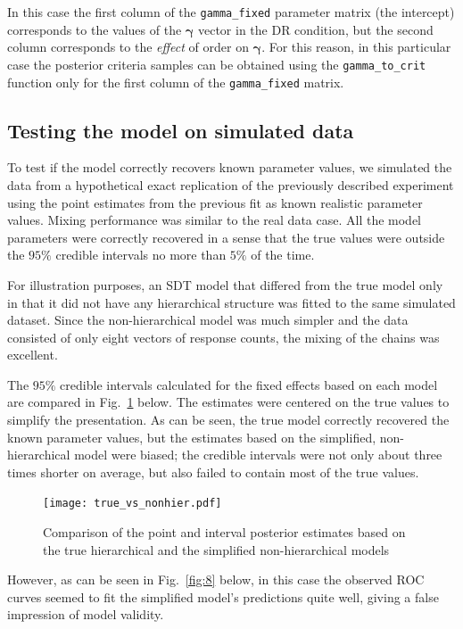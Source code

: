 \documentclass[a4paper,man,apacite,floatsintext]{apa6}
\newcommand{\code}[1]{\texttt{#1}}
\begin{document}
In this case the first column of the \code{gamma\_fixed} parameter
matrix (the intercept) corresponds to the values of the $\bm{\gamma}$
vector in the DR condition, but the second column corresponds to the
\emph{effect} of order on $\bm{\gamma}$. For this reason, in this
particular case the posterior criteria samples can be obtained using
the \code{gamma\_to\_crit} function only for the first column of the
\code{gamma\_fixed} matrix.

\subsection{Testing the model on simulated data}

To test if the model correctly recovers known parameter values, we
simulated the data from a hypothetical exact replication of the
previously described experiment using the point estimates from the
previous fit as known realistic parameter values. Mixing performance
was similar to the real data case. All the model parameters were
correctly recovered in a sense that the true values were outside the
$95\%$ credible intervals no more than $5\%$ of the time.

For illustration purposes, an SDT model that differed from the true
model only in that it did not have any hierarchical structure was
fitted to the same simulated dataset. Since the non-hierarchical model
was much simpler and the data consisted of only eight vectors of
response counts, the mixing of the chains was excellent.

The $95\%$ credible intervals calculated for the fixed effects based
on each model are compared in Fig.~\ref{fig:5} below. The estimates
were centered on the true values to simplify the presentation. As can
be seen, the true model correctly recovered the known parameter
values, but the estimates based on the simplified, non-hierarchical
model were biased; the credible intervals were not only about three
times shorter on average, but also failed to contain most of the true
values.

\begin{figure}[H]
  \centering
  \texttt{[image: true\_vs\_nonhier.pdf]}
  \caption{Comparison of the point and interval posterior estimates
    based on the true hierarchical and the simplified non-hierarchical
    models}
  \label{fig:5}
\end{figure}

However, as can be seen in Fig.~\ref{fig:8} below, in this case the
observed ROC curves seemed to fit the simplified model's predictions
quite well, giving a false impression of model validity.
\end{document}
